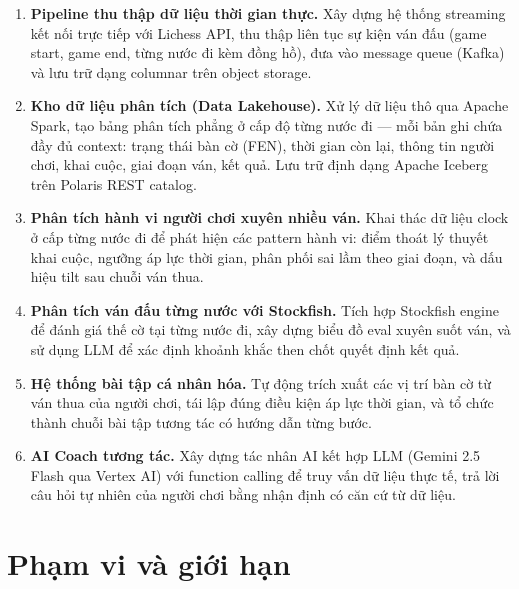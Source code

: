 \documentclass[14pt,a4paper]{extarticle}
\begin{document}
\begin{enumerate}[label=\textbf{MT\arabic*.}, leftmargin=2.2cm]

  \item \textbf{Pipeline thu thập dữ liệu thời gian thực.}
    Xây dựng hệ thống streaming kết nối trực tiếp với Lichess API, thu thập
    liên tục sự kiện ván đấu (game start, game end, từng nước đi kèm đồng hồ),
    đưa vào message queue (Kafka) và lưu trữ dạng columnar trên object storage.

  \item \textbf{Kho dữ liệu phân tích (Data Lakehouse).}
    Xử lý dữ liệu thô qua Apache Spark, tạo bảng phân tích phẳng ở cấp độ
    từng nước đi --- mỗi bản ghi chứa đầy đủ context: trạng thái bàn cờ
    (FEN), thời gian còn lại, thông tin người chơi, khai cuộc, giai đoạn ván,
    kết quả. Lưu trữ định dạng Apache Iceberg trên Polaris REST catalog.

  \item \textbf{Phân tích hành vi người chơi xuyên nhiều ván.}
    Khai thác dữ liệu clock ở cấp từng nước đi để phát hiện các pattern hành
    vi: điểm thoát lý thuyết khai cuộc, ngưỡng áp lực thời gian, phân phối
    sai lầm theo giai đoạn, và dấu hiệu tilt sau chuỗi ván thua.

  \item \textbf{Phân tích ván đấu từng nước với Stockfish.}
    Tích hợp Stockfish engine để đánh giá thế cờ tại từng nước đi, xây dựng
    biểu đồ eval xuyên suốt ván, và sử dụng LLM để xác định khoảnh khắc then
    chốt quyết định kết quả.

  \item \textbf{Hệ thống bài tập cá nhân hóa.}
    Tự động trích xuất các vị trí bàn cờ từ ván thua của người chơi, tái lập
    đúng điều kiện áp lực thời gian, và tổ chức thành chuỗi bài tập tương tác
    có hướng dẫn từng bước.

  \item \textbf{AI Coach tương tác.}
    Xây dựng tác nhân AI kết hợp LLM (Gemini 2.5 Flash qua Vertex AI) với
    function calling để truy vấn dữ liệu thực tế, trả lời câu hỏi tự nhiên
    của người chơi bằng nhận định có căn cứ từ dữ liệu.

\end{enumerate}

\section{Phạm vi và giới hạn}
\end{document}
